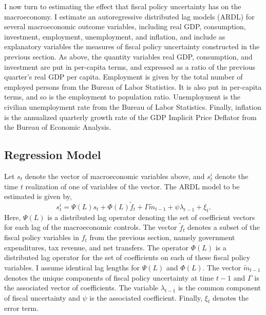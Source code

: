 \documentclass[11pt]{article}
\newcommand{\beq}{\begin{equation}}
\newcommand{\eeq}{\end{equation}}
\begin{document}
I now turn to estimating the effect that fiscal policy uncertainty has on the macroeconomy.  I estimate an autoregressive distributed lag models (ARDL) for several macroeconomic outcome variables, including real GDP, consumption, investment, employment, unemployment, and inflation, and include as explanatory variables the measures of fiscal policy uncertainty constructed in the previous section.  As above, the quantity variables real GDP, consumption, and investment are put in per-capita terms, and expressed as a ratio of the previous quarter's real GDP per capita.  Employment is given by the total number of employed persons from the Bureau of Labor Statistics.  It is also put in per-capita terms, and so is the employment to population ratio.  Unemployment is the civilian unemployment rate from the Bureau of Labor Statistics.  Finally, inflation is the annualized quarterly growth rate of the GDP Implicit Price Deflator from the Bureau of Economic Analysis.

\subsection{Regression Model}

Let $s_t$ denote the vector of macroeconomic variables above, and $s_t^i$ denote the time $t$ realization of one of variables of the vector.  The ARDL model to be estimated is given by,
\beq \label{eg:ardl} s_t^i = \Psi(L)s_t + \Phi(L)\tilde{f}_t + \Gamma \tilde{m}_{t-1} + \psi \lambda_{t-1} + \xi_t. \eeq
Here, $\Psi(L)$ is a distributed lag operator denoting the set of coefficient vectors for each lag of the macroeconomic controls.  The vector $\tilde{f}_t$ denotes a subset of the fiscal policy variables in $f_t$ from the previous section, namely government expenditures, tax revenue, and net transfers.  The operator $\Phi(L)$ is a distributed lag operator for the set of coefficients on each of these fiscal policy variables.  I assume identical lag lengths for $\Psi(L)$ and $\Phi(L)$.  The vector $\tilde{m}_{t-1}$ denotes the unique components of fiscal policy uncertainty at time $t-1$ and $\Gamma$ is the associated vector of coefficients.  The variable $\lambda_{t-1}$ is the common component of fiscal uncertainty and $\psi$ is the associated coefficient.  Finally, $\xi_t$ denotes the error term.  




\end{document}
